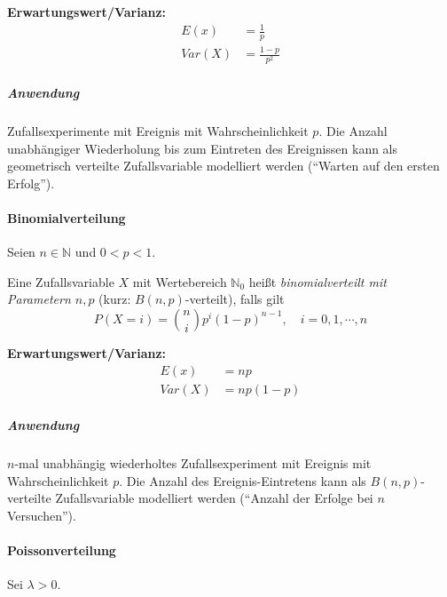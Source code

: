 \documentclass[a4paper, 11pt, accentcolor = tud3b]{tudreport}
\newcommand{\N}{\ensuremath{\mathbb{N}}}
\newcommand{\Var}{\ensuremath{\textit{Var}}}
\begin{document}
	                    \textbf{Erwartungswert/Varianz:}
	                    \begin{align*}
	                    	E(x)    & = \frac{1}{p}       \\
	                    	\Var(X) & = \frac{1 - p}{p^2}
	                    \end{align*}
	                    
	                    \subparagraph{Anwendung}
		                    Zufallsexperimente mit Ereignis mit Wahrscheinlichkeit \(p\). Die Anzahl unabhängiger Wiederholung bis zum Eintreten des Ereignissen kann als geometrisch verteilte Zufallsvariable modelliert werden (\enquote{Warten auf den ersten Erfolg}).

                    \paragraph{Binomialverteilung}
                        Seien \( n \in \N \) und \( 0 < p < 1 \).
                        
                        Eine Zufallsvariable \(X\) mit Wertebereich \( \N_0 \) heißt \textit{binomialverteilt mit Parametern \( n, p \)} (kurz: \( B(n, p) \)-verteilt), falls gilt
                        \begin{equation*}
	                        P(X = i) = { n \choose i } p^i (1 - p)^{ n - 1 }, \quad i = 0, 1, \cdots, n
                        \end{equation*}
                        
                        \textbf{Erwartungswert/Varianz:}
                        \begin{align*}
                        	E(x)    & = np      \\
                        	\Var(X) & = np(1-p)
                        \end{align*}
                        
                        \subparagraph{Anwendung}
	                        \(n\)-mal unabhängig wiederholtes Zufallsexperiment mit Ereignis mit Wahrscheinlichkeit \(p\). Die Anzahl des Ereignis-Eintretens kann als \( B(n, p) \)-verteilte Zufallsvariable modelliert werden (\enquote{Anzahl der Erfolge bei \(n\) Versuchen}).

                    \paragraph{Poissonverteilung}
                        Sei \( \lambda > 0 \).
                        
\end{document}
